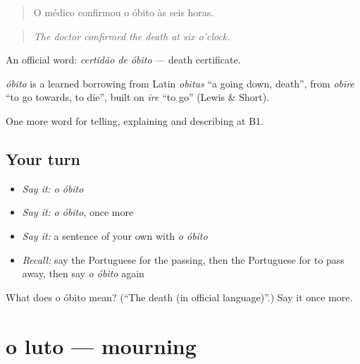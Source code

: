 \begin{quote}
O médico confirmou o óbito às seis horas.
\end{quote}

\begin{quote}
\emph{The doctor confirmed the death at six o’clock.}
\end{quote}

An official word: \emph{certidão de óbito} — death certificate.

\begin{cousinweb}
\emph{óbito} is a learned borrowing from Latin \emph{obitus} \textquotedblleft{}a going down, death\textquotedblright{}, from \emph{obīre} \textquotedblleft{}to go towards, to die\textquotedblright{}, built on \emph{īre} \textquotedblleft{}to go\textquotedblright{} (Lewis \& Short).
\end{cousinweb}

\begin{grammarlens}[title={What you've built}]
One more word for telling, explaining and describing at B1.
\end{grammarlens}

\subsection*{Your turn}
\begin{itemize}
\raggedright
  \item \emph{Say it:} \emph{o óbito}
  \item \emph{Say it:} \emph{o óbito}, once more
  \item \emph{Say it:} a sentence of your own with \emph{o óbito}
  \item \emph{Recall:} say the Portuguese for the passing, then the Portuguese for to pass away, then say \emph{o óbito} again
\end{itemize}

\begin{tcolorbox}[breakable,colback=teal!4,colframe=teal!35!black,title={Before you move on}]
What does o óbito mean? (\textquotedblleft{}The death (in official language)\textquotedblright{}.) Say it once more.
\end{tcolorbox}
\section[o luto]{o luto — mourning}

\label{lesson:PT-C314-luto}



